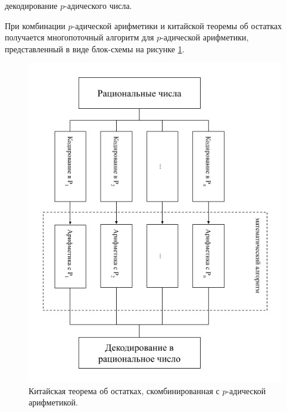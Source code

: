 \documentclass[master, och, diploma, times]{sty/SCWorks}
\theoremstyle{plain}
\theoremstyle{definition}
\numberwithin{equation}{section}
\begin{document}
\begin{algorithm}
\DontPrintSemicolon %
\caption{декодирование $p$-адического числа.}
\label{algo:decoding}
\end{algorithm}

При комбинации $p$-адической арифметики и китайской теоремы об остатках получается многопоточный алгоритм для $p$-адической арифметики, представленный в виде блок-схемы на рисунке \ref{img:multi:schema}.

\begin{figure}[H]
\centerline{\includegraphics[width=0.7\linewidth]{images/multi/schema.png}}
\caption{Китайская теорема об остатках, скомбинированная с $p$-адической арифметикой.}
\label{img:multi:schema}
\end{figure}
\end{document}
